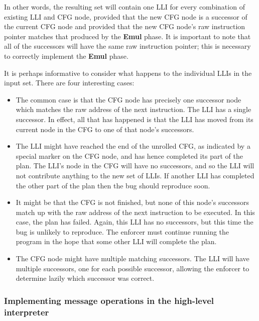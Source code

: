 In other words, the resulting set will contain one LLI for every
combination of existing LLI and CFG node, provided that the new CFG
node is a successor of the current CFG node and provided that the new
CFG node's raw instruction pointer matches that produced by the
\textbf{Emul} phase.  It is important to note that all of the
successors will have the same raw instruction pointer; this is
necessary to correctly implement the \textbf{Emul} phase.

It is perhaps informative to consider what happens to the individual
LLIs in the input set.  There are four interesting cases:

\begin{itemize}
\item The common case is that the CFG node has precisely one successor
  node which matches the raw address of the next instruction.  The LLI
  has a single successor.  In effect, all that has happened is that
  the LLI has moved from its current node in the CFG to one of that
  node's successors.

\item The LLI might have reached the end of the unrolled CFG, as
  indicated by a special marker on the CFG node, and has hence
  completed its part of the plan.  The LLI's node in the CFG will have
  no successors, and so the LLI will not contribute anything to the
  new set of LLIs.  If another LLI has completed the other part of the
  plan then the bug should reproduce soon.

\item It might be that the CFG is not finished, but none of this
  node's successors match up with the raw address of the next
  instruction to be executed.  In this case, the plan has failed.
  Again, this LLI has no successors, but this time the bug is unlikely
  to reproduce.  The enforcer must continue running the program in the
  hope that some other LLI will complete the plan.

\item The CFG node might have multiple matching successors.  The LLI
  will have multiple successors, one for each possible successor,
  allowing the enforcer to determine lazily which successor was
  correct.
\end{itemize}

\subsubsection{Implementing message operations in the high-level interpreter}
\label{sect:enforce:hli_messages}

